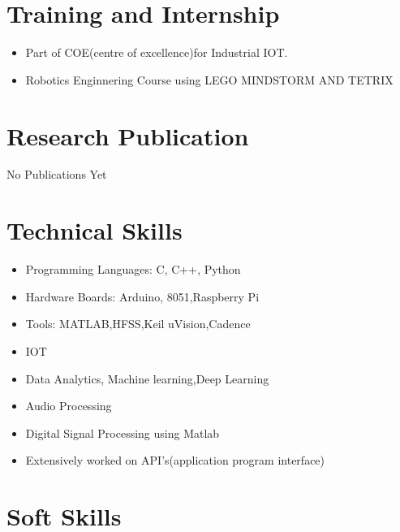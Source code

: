 \documentclass[12pt,a4paper,sans]{moderncv} %
\begin{document}
\begin{table}
\section{Training and Internship}

\begin{itemize}
	\item Part of COE(centre of excellence)for Industrial IOT.
	\item Robotics Enginnering Course using LEGO MINDSTORM AND TETRIX 
	
\end{itemize}



\section{Research Publication}

No Publications Yet
\hfill
\break




\section{Technical Skills}

\begin{itemize}
	\item Programming Languages: C, C++, Python
	\item Hardware Boards: Arduino, 8051,Raspberry Pi
	\item Tools: MATLAB,HFSS,Keil uVision,Cadence
	\item IOT
	\item Data Analytics, Machine learning,Deep Learning
	\item Audio Processing
	\item Digital Signal Processing using Matlab
	\item Extensively worked on API’s(application program interface)
\end{itemize}



\section{Soft Skills}


\end{table}
\end{document}
